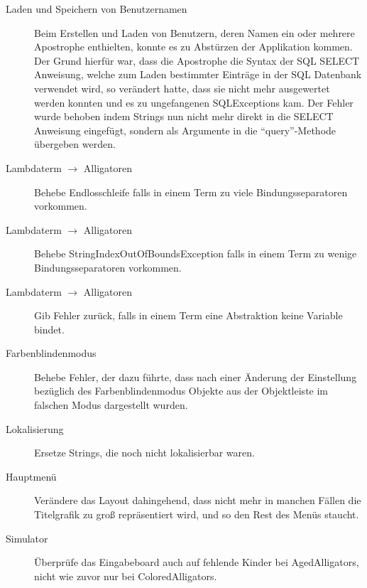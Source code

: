 \begin{description}
	\item[Laden und Speichern von Benutzernamen] Beim Erstellen und Laden von Benutzern, deren Namen ein oder mehrere Apostrophe enthielten, konnte es zu Abstürzen der Applikation kommen. 
		Der Grund hierfür war, dass die Apostrophe die Syntax der SQL SELECT Anweisung, welche zum Laden bestimmter Einträge in der SQL Datenbank verwendet wird, so verändert hatte, dass sie nicht mehr ausgewertet werden konnten und es zu ungefangenen SQLExceptions kam. 
		Der Fehler wurde behoben indem Strings nun nicht mehr direkt in die SELECT Anweisung eingefügt, sondern als Argumente in die "`query"'-Methode übergeben werden.
	\item[Lambdaterm $\rightarrow$ Alligatoren] Behebe Endlosschleife falls in einem Term zu viele Bindungsseparatoren vorkommen.
	\item[Lambdaterm $\rightarrow$ Alligatoren] Behebe StringIndexOutOfBoundsException falls in einem Term zu wenige Bindungsseparatoren vorkommen.
	\item[Lambdaterm $\rightarrow$ Alligatoren] Gib Fehler zurück, falls in einem Term eine Abstraktion keine Variable bindet.
	\item[Farbenblindenmodus] Behebe Fehler, der dazu führte, dass nach einer Änderung der Einstellung bezüglich des Farbenblindenmodus Objekte aus der Objektleiste im falschen Modus dargestellt wurden.
	\item[Lokalisierung] Ersetze Strings, die noch nicht lokalisierbar waren.
	\item[Hauptmenü] Verändere das Layout dahingehend, dass nicht mehr in manchen Fällen die Titelgrafik zu groß repräsentiert wird, und so den Rest des Menüs staucht. 

	\item[Simulator] Überprüfe das Eingabeboard auch auf fehlende Kinder bei AgedAlligators, nicht wie zuvor nur bei ColoredAlligators.
\end{description}


